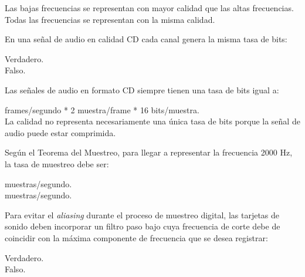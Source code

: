\documentclass[legalpaper, 12pt, addpoints]{exam}
\begin{document}
\begin{questions}
\begin{oneparchoices}
  \choice Las bajas frecuencias se representan con mayor calidad que las altas frecuencias.\\
  \choice Todas las frecuencias se representan con la misma calidad.
\end{oneparchoices}
  
\vspace{0.10in}

\question En una señal de audio en calidad CD cada canal genera la misma tasa de bits:

\begin{oneparchoices}
  \choice Verdadero.\\
  \choice Falso.
\end{oneparchoices}
  
\vspace{0.10in}

\question Las señales de audio en formato CD siempre tienen una tasa de bits igual a:

\begin{oneparchoices}
   frames/segundo * 2 muestra/frame * 16 bits/muestra.\\
  \choice La calidad no representa necesariamente una única tasa de
  bits porque la señal de audio puede estar comprimida.
\end{oneparchoices}
  
\vspace{0.10in}

\question Según el Teorema del Muestreo, para llegar a representar la
frecuencia 2000 Hz, la tasa de muestreo debe ser:

\begin{oneparchoices}
   muestras/segundo.\\
   muestras/segundo.
\end{oneparchoices}
  
\vspace{0.10in}

\question Para evitar el \emph{aliasing} durante el proceso de
muestreo digital, las tarjetas de sonido deben incorporar un filtro
paso bajo cuya frecuencia de corte debe de coincidir con la máxima
componente de frecuencia que se desea registrar:

\begin{oneparchoices}
  \choice Verdadero.\\
  \choice Falso.
\end{oneparchoices}
  

\end{questions}
\end{document}
